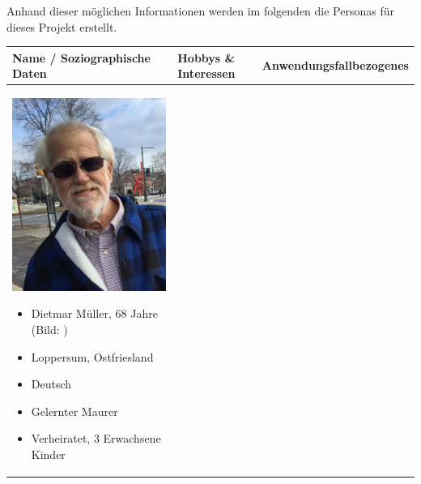 Anhand dieser möglichen Informationen werden im folgenden die Personas für dieses Projekt erstellt.
\begin{center}
	\begin{tabular}{| p{} | p{} | p{} |}
		\hline
		\cellcolor{blue!25}Name / Soziographische Daten & \cellcolor{red!25}Hobbys \& Interessen & \cellcolor{green!25}Anwendungsfallbezogenes \\
		\hline
		\vspace{0.3mm}
		\begin{minipage}{.2\textwidth}
			\includegraphics[width=\linewidth]{../pictures/persona1.jpg}
		\end{minipage}
		\begin{itemize}
			\item Dietmar Müller, 68 Jahre (Bild: \cite{persona1})
			\item Loppersum, Ostfriesland
			\item Deutsch 
			\item Gelernter Maurer
			\item Verheiratet, 3 Erwachsene Kinder

\end{itemize}
\end{tabular}
\end{center}
